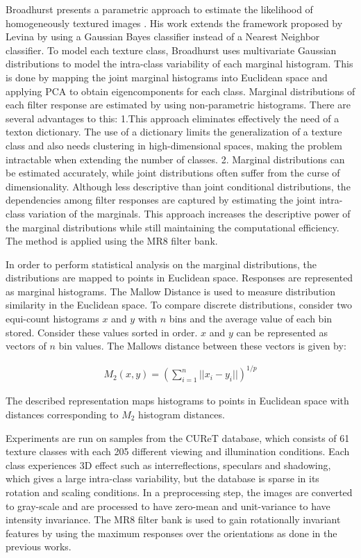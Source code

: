 Broadhurst presents a parametric approach to estimate the likelihood of homogeneously textured images \cite{Broadhurst}. His work extends the framework proposed by Levina \cite{Levina} by using a Gaussian Bayes classifier instead of a Nearest Neighbor classifier. To model each texture class, Broadhurst uses multivariate Gaussian distributions to model the intra-class variability of each marginal histogram. This is done by mapping the joint marginal histograms into Euclidean space and applying PCA to obtain eigencomponents for each class.
Marginal distributions of each filter response are estimated by using non-parametric histograms. There are several advantages to this:
	1.This approach eliminates effectively the need of a texton dictionary. The use of a dictionary limits the generalization of a texture class and also needs clustering in high-dimensional spaces, making the problem intractable when extending the number of classes.
	2. Marginal distributions can be estimated accurately, while joint distributions often suffer from the curse of dimensionality.
Although less descriptive than joint conditional distributions, the dependencies among filter responses are captured by estimating the joint intra-class variation of the marginals. This approach increases the descriptive power of the marginal distributions while still maintaining the computational efficiency. The method is applied using the MR8 filter bank.

In order to perform statistical analysis on the marginal distributions, the distributions are mapped to points in Euclidean space. Responses are represented as marginal histograms. The Mallow Distance is used to measure distribution similarity in the Euclidean space. To compare discrete distributions, consider two equi-count histograms $x$ and $y$ with $n$ bins and the average value of each bin stored. Consider these values sorted in order. $x$ and $y$ can be represented as vectors of $n$ bin values. The Mallows distance between these vectors is given by:

	\begin{eqnarray*}
		M_2(x, y) = (\sum^n_{i=1} ||x_i - y_i||)^{1/p}
	\end{eqnarray*}

The described representation maps histograms to points in Euclidean space with distances corresponding to $M_2$ histogram distances.

Experiments are run on samples from the CUReT database, which consists of 61 texture classes with each 205 different viewing and illumination conditions. Each class experiences 3D effect such as interreflections, speculars and shadowing, which gives a large intra-class variability, but the database is sparse in its rotation and scaling conditions. In a preprocessing step, the images are converted to gray-scale and are processed to have zero-mean and unit-variance to have intensity invariance. The MR8 filter bank is used to gain rotationally invariant features by using the maximum responses over the orientations as done in the previous works.

